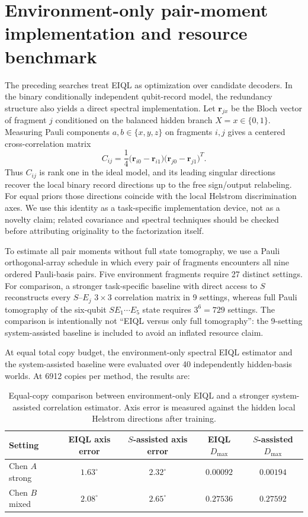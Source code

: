 \section{Environment-only pair-moment implementation and resource benchmark}

The preceding searches treat EIQL as optimization over candidate decoders. In the binary conditionally independent qubit-record model, the redundancy structure also yields a direct spectral implementation. Let $\mathbf r_{jx}$ be the Bloch vector of fragment $j$ conditioned on the balanced hidden branch $X=x\in\{0,1\}$. Measuring Pauli components $a,b\in\{x,y,z\}$ on fragments $i,j$ gives a centered cross-correlation matrix
\begin{equation}
C_{ij}=\frac14\bigl(\mathbf r_{i0}-\mathbf r_{i1}\bigr)
                 \bigl(\mathbf r_{j0}-\mathbf r_{j1}\bigr)^T.
\label{eq:pairmoment}
\end{equation}
Thus $C_{ij}$ is rank one in the ideal model, and its leading singular directions recover the local binary record directions up to the free sign/output relabeling. For equal priors those directions coincide with the local Helstrom discrimination axes. We use this identity as a task-specific implementation device, not as a novelty claim; related covariance and spectral techniques should be checked before attributing originality to the factorization itself.

To estimate all pair moments without full state tomography, we use a Pauli orthogonal-array schedule in which every pair of fragments encounters all nine ordered Pauli-basis pairs. Five environment fragments require 27 distinct settings. For comparison, a stronger task-specific baseline with direct access to $S$ reconstructs every $S$--$E_j$ $3\times3$ correlation matrix in 9 settings, whereas full Pauli tomography of the six-qubit $S E_1\cdots E_5$ state requires $3^6=729$ settings. The comparison is intentionally not ``EIQL versus only full tomography'': the 9-setting system-assisted baseline is included to avoid an inflated resource claim.

At equal total copy budget, the environment-only spectral EIQL estimator and the system-assisted baseline were evaluated over 40 independently hidden-basis worlds. At 6912 copies per method, the results are:

\begin{table}[H]
\centering
\caption{Equal-copy comparison between environment-only EIQL and a stronger system-assisted correlation estimator. Axis error is measured against the hidden local Helstrom directions after training.}
\label{tab:resource}
\begin{tabular}{lcccc}
\toprule
Setting & EIQL axis error & $S$-assisted axis error & EIQL $D_{\max}$ & $S$-assisted $D_{\max}$ \\
\midrule
Chen $A$ strong & $1.63^\circ$ & $2.32^\circ$ & $0.00092$ & $0.00194$ \\
Chen $B$ mixed & $2.08^\circ$ & $2.65^\circ$ & $0.27536$ & $0.27592$ \\
\bottomrule
\end{tabular}
\end{table}

